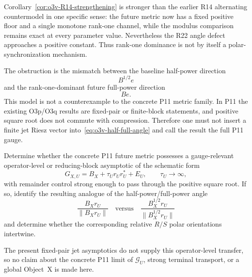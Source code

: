 \begin{remark}
\label{rem:o3v-firewall}
Corollary~\ref{cor:o3v-R14-strengthening} is stronger than the earlier R14 alternating
countermodel in one specific sense: the future metric now has a fixed positive floor and
a single monotone rank-one channel, while the modulus comparison remains exact at every
parameter value.  Nevertheless the R22 angle defect approaches a positive constant.
Thus rank-one dominance is not by itself a polar-synchronization mechanism.

The obstruction is the mismatch between the baseline half-power direction
\[
 B^{1/2}e
\]
and the rank-one-dominant future full-power direction
\[
 Be.
\]
This model is not a counterexample to the concrete P11 metric family.  In P11 the
existing O3p/O3q results are fixed-pair or finite-block statements, and positive square
root does not commute with compression.  Therefore one must not insert a finite jet
Riesz vector into~\eqref{eq:o3v-half-full-angle} and call the result the full P11 gauge.
\end{remark}

\begin{openproblem}
\label{open:o3v-dominant-angle}
Determine whether the concrete P11 future metric possesses a gauge-relevant
operator-level or reducing-block asymptotic of the schematic form
\[
 G_{X,U}=B_X+\tau_U r_Ur_U^*+E_U,
 \qquad \tau_U\to\infty,
\]
with remainder control strong enough to pass through the positive square root.  If so,
identify the resulting analogue of the half-power/full-power angle
\[
 \frac{B_Xr_U}{\|B_Xr_U\|}
 \quad\text{versus}\quad
 \frac{B_X^{1/2}r_U}{\|B_X^{1/2}r_U\|}
\]
and determine whether the corresponding relative \(R/S\) polar orientations
intertwine.

The present fixed-pair jet asymptotics do not supply this operator-level transfer, so no
claim about the concrete P11 limit of \(\mathscr G_U\), strong terminal transport, or a
global Object~X is made here.
\end{openproblem}
